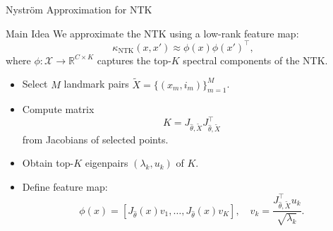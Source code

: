 \documentclass{beamer}
\begin{document}
\begin{frame}{Nyström Approximation for NTK}

\begin{block}{Main Idea}
We approximate the NTK using a low-rank feature map:
\[
\kappa_{\text{NTK}}(x, x') \approx \phi(x)\phi(x')^\top,
\]
where $\phi: \mathcal{X} \to \mathbb{R}^{C \times K}$ captures the top-$K$ spectral components of the NTK.
\end{block}

\begin{itemize}
    \item Select $M$ landmark pairs $\widetilde{X} = \{(x_m, i_m)\}_{m=1}^M$.
    \item Compute matrix 
    \[
        K = J_{\hat{\theta}, \widetilde{X}} J_{\hat{\theta}, \widetilde{X}}^\top
    \]
      from Jacobians of selected points.
    \item Obtain top-$K$ eigenpairs $(\lambda_k, u_k)$ of $K$.
    \item Define feature map:
    \[
        \phi(x) = [J_{\hat{\theta}}(x)v_1, \dots, J_{\hat{\theta}}(x)v_K], 
        \quad v_k = \frac{J_{\hat{\theta}, \widetilde{X}}^\top u_k}{\sqrt{\lambda_k}}.
    \]
\end{itemize}

\end{frame}
\end{document}
